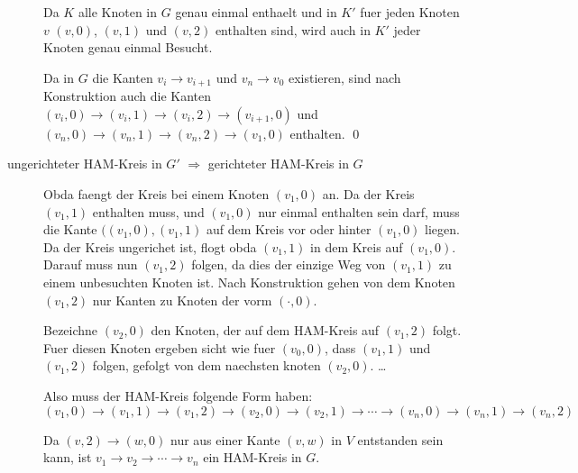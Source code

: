 \begin{description}
Da $K$ alle Knoten in $G$ genau einmal enthaelt und in $K'$ fuer jeden Knoten $v$ $(v,0)$, $(v,1)$ und $(v,2)$ enthalten sind,
wird auch in $K'$ jeder Knoten genau einmal Besucht.

Da in $G$ die Kanten $v_i \to v_{i+1}$ und $v_n \to v_0$ existieren,
   sind nach Konstruktion auch die Kanten $(v_i,0) \to (v_i,1) \to (v_i,2) \to (v_{i+1},0)$ und
   $(v_n,0) \to (v_n,1) \to (v_n,2) \to (v_1,0)$ enthalten.
   \qed


\item[ungerichteter HAM-Kreis in $G'$ $\Rightarrow$ gerichteter HAM-Kreis in $G$]

Obda faengt der Kreis bei einem Knoten $(v_1,0)$ an. Da der Kreis $(v_1,1)$ enthalten muss,
und $(v_1,0)$ nur einmal enthalten sein darf, muss die Kante $((v_1,0),(v_1,1)$ auf dem Kreis
vor oder hinter $(v_1,0)$ liegen. Da der Kreis ungerichet ist, flogt obda $(v_1,1)$ in dem Kreis auf $(v_1,0)$.
Darauf muss nun $(v_1,2)$ folgen, da dies der einzige Weg von $(v_1,1)$ zu einem unbesuchten Knoten ist.
Nach Konstruktion gehen von dem Knoten $(v_1,2)$ nur Kanten zu Knoten der vorm $(\cdot,0)$. 

Bezeichne $(v_2,0)$ den Knoten, der auf dem HAM-Kreis auf $(v_1,2)$ folgt. Fuer diesen Knoten
ergeben sicht wie fuer $(v_0,0)$, dass $(v_1,1)$ und $(v_1,2)$ folgen, gefolgt von dem naechsten 
knoten $(v_2,0)$. \ldots

Also muss der HAM-Kreis folgende Form haben: 
$(v_1,0) \to (v_1,1) \to (v_1,2) \to (v_2,0) \to (v_2,1) \to \cdots \to (v_n,0) \to (v_n,1) \to (v_n,2)$

Da $(v,2) \to (w,0)$ nur aus einer Kante $(v,w)$ in $V$ entstanden sein kann,
ist $v_1 \to v_2 \to \cdots \to v_n$ ein HAM-Kreis in $G$.

\end{description}


